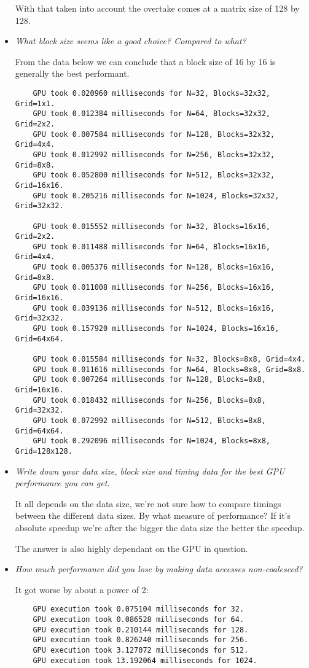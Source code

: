 \documentclass[a4paper,12pt]{article}
\begin{document}
\begin{itemize}
  With that taken into account the overtake comes at a matrix size of 128 by 128.

\item \textit{What block size seems like a good choice? Compared to what?}

  From the data below we can conclude that a block size of 16 by 16 is generally the best performant.

  \begin{lstlisting}
    GPU took 0.020960 milliseconds for N=32, Blocks=32x32, Grid=1x1.
    GPU took 0.012384 milliseconds for N=64, Blocks=32x32, Grid=2x2.
    GPU took 0.007584 milliseconds for N=128, Blocks=32x32, Grid=4x4.
    GPU took 0.012992 milliseconds for N=256, Blocks=32x32, Grid=8x8.
    GPU took 0.052800 milliseconds for N=512, Blocks=32x32, Grid=16x16.
    GPU took 0.205216 milliseconds for N=1024, Blocks=32x32, Grid=32x32.

    GPU took 0.015552 milliseconds for N=32, Blocks=16x16, Grid=2x2.
    GPU took 0.011488 milliseconds for N=64, Blocks=16x16, Grid=4x4.
    GPU took 0.005376 milliseconds for N=128, Blocks=16x16, Grid=8x8.
    GPU took 0.011008 milliseconds for N=256, Blocks=16x16, Grid=16x16.
    GPU took 0.039136 milliseconds for N=512, Blocks=16x16, Grid=32x32.
    GPU took 0.157920 milliseconds for N=1024, Blocks=16x16, Grid=64x64.

    GPU took 0.015584 milliseconds for N=32, Blocks=8x8, Grid=4x4.
    GPU took 0.011616 milliseconds for N=64, Blocks=8x8, Grid=8x8.
    GPU took 0.007264 milliseconds for N=128, Blocks=8x8, Grid=16x16.
    GPU took 0.018432 milliseconds for N=256, Blocks=8x8, Grid=32x32.
    GPU took 0.072992 milliseconds for N=512, Blocks=8x8, Grid=64x64.
    GPU took 0.292096 milliseconds for N=1024, Blocks=8x8, Grid=128x128.
  \end{lstlisting}


\item \textit{Write down your data size, block size and timing data for the best GPU performance you can get.}

  It all depends on the data size, we're not sure how to compare timings between the different data sizes. By what measure of performance? If it's absolute speedup we're after the bigger the data size the better the speedup.

  The answer is also highly dependant on the GPU in question.


\item \textit{How much performance did you lose by making data accesses non-coalesced?}

  It got worse by about a power of 2:

  \begin{lstlisting}
    GPU execution took 0.075104 milliseconds for 32.
    GPU execution took 0.086528 milliseconds for 64.
    GPU execution took 0.210144 milliseconds for 128.
    GPU execution took 0.826240 milliseconds for 256.
    GPU execution took 3.127072 milliseconds for 512.
    GPU execution took 13.192064 milliseconds for 1024.
  \end{lstlisting}

\end{itemize}
\end{document}
